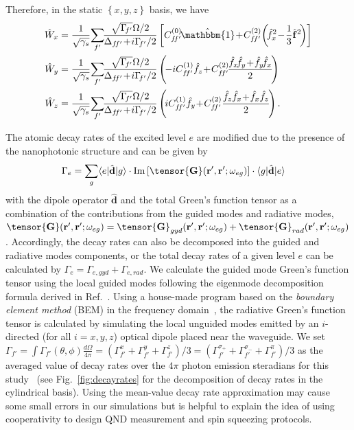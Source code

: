 \documentclass[aps,pra,twocolumn,superscriptaddress]{revtex4-1} %
\def\br{\mathbf{r}}
\def\bra#1{\langle{#1}\rvert}%
\def\ket#1{\lvert{#1}\rangle}%
\newcommand{\nn}{\nonumber}
\begin{document}
\begin{appendix}
Therefore, in the static $ \left\{x,y,z \right\} $ basis, we have
\begin{align}
\hat{W}_{x} &= \frac{1}{\sqrt{\gamma_s}}\!\sum_{f'}\!\! \frac{\sqrt{\Gamma\!_{f'}}\Omega/2}{\Delta_{f\!f'}\!+\!i\Gamma\!_{f'}/2} \left[C_{f\!f'}^{(0)}\!\hat{\mathbbm{1}} \!+\! C_{f\!f'}^{(2)}\!\left(\!\hat{f}_{x}^2 \!-\! \frac{1}{3}\hat{\mathbf{f}}^2\! \right) \right]\nn\\
\hat{W}_{y} &= \frac{1}{\sqrt{\gamma_s}}\!\sum_{f'}\!\! \frac{\sqrt{\Gamma\!_{f'}}\Omega/2}{\Delta_{f\!f'} \!+\! i\Gamma\!_{f'}/2} \left(\!-iC_{f\!f'}^{(1)}\hat{f}_z \!+\! C_{f\!f'}^{(2)}\!\frac{\hat{f}_{x}\!\hat{f}_{y} \!+\! \hat{f}_{y}\!\hat{f}_{x}}{2}\! \right)\nn\\
\hat{W}_{z} &= \frac{1}{\sqrt{\gamma_s}}\!\sum_{f'}\!\! \frac{\sqrt{\Gamma\!_{f'}}\Omega/2}{\Delta_{f\!f'} \!+\! i\Gamma\!_{f'}/2} \left(\!iC_{f\!f'}^{(1)}\hat{f}_{y} \!+\! C_{f\!f'}^{(2)}\frac{\hat{f}_z\hat{f}_{x} \!+\! \hat{f}_{x}\hat{f}_z}{2} \! \right).\nn
\end{align}

The atomic decay rates of the excited level $ e $ are modified due to the presence of the nanophotonic structure and can be given by
\begin{align}
\Gamma_e &= \sum_g \bra{e}\hat{\mathbf{d}}\ket{g} \cdot \mathrm{Im}\left[\tensor{\mathbf{G}}(\br',\br';\omega_{eg}) \right]\cdot \bra{g}\hat{\mathbf{d}}\ket{e}
\end{align}
with the dipole operator $ \hat{\mathbf{d}} $ and the total Green's function tensor as a combination of the contributions from the guided modes and radiative modes, $ \tensor{\mathbf{G}}(\br',\br';\omega_{eg})=\tensor{\mathbf{G}}_{gyd}(\br',\br';\omega_{eg})+\tensor{\mathbf{G}}_{rad}(\br',\br';\omega_{eg}) $.
Accordingly, the decay rates can also be decomposed into the guided and radiative modes components, or the total decay rates of a given level $ e $ can be calculated by $ \Gamma_e=\Gamma_{e,gyd}+\Gamma_{e,rad} $.
We calculate the guided mode Green's function tensor using the local guided modes following the eigenmode decomposition formula derived in Ref.~\cite{Qi2016}. Using a house-made program based on the \textit{boundary element method} (BEM) in the frequency domain~\cite{Abajo2002,GarciadeAbajo1998Relativistic}, the radiative Green's function tensor is calculated by simulating the local unguided modes emitted by an $i$-directed (for all $ i=x,y,z $) optical dipole placed near the waveguide. We set $ \Gamma_{f'}= \int \Gamma_{f'}(\theta,\phi)\frac{d\Omega}{4\pi}=(\Gamma_{f'}^x+\Gamma_{f'}^y+\Gamma_{f'}^z)/3=(\Gamma_{f'}^{\sigma_+}+\Gamma_{f'}^{\sigma_-}+\Gamma_{f'}^\pi)/3$ as the averaged value of decay rates over the $4\pi$ photon emission steradians for this study~\cite{Novotny2012} (see Fig.~\ref{fig:decayrates} for the decomposition of decay rates in the cylindrical basis). Using the mean-value decay rate approximation may cause some small errors in our simulations but is helpful to explain the idea of using cooperativity to design QND measurement and spin squeezing protocols. 


\end{appendix}
\end{document}
